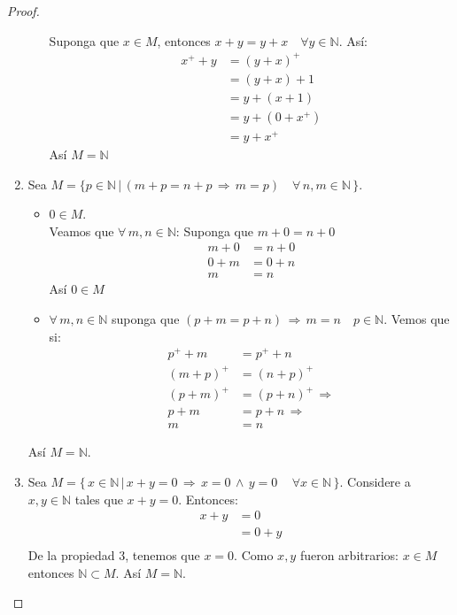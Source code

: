 \begin{proof}
\begin{enumerate}
\begin{itemize}
                Suponga que $x \in M$, entonces $x + y = y +x \quad \forall y
                \in \mathbb{N}$. Así:
                \begin{align*}
                    x^+ + y &= (y + x)^+ \\
                            &= (y + x)+1 \\
                            &= y + (x + 1) \\
                            &= y + (0 + x^+) \\
                            &= y + x^+
                \end{align*}
                Así $M = \mathbb{N}$
        \end{itemize}
    \item Sea $M = \{ p \in \mathbb{N} \, | \, (m + p = n + p \, \Rightarrow \, m
        = p) \quad \forall \, n, m \in \mathbb{N} \, \}$. 
        \begin{itemize}
            \item $0 \in M$. \\
                Veamos que $\forall \, m, n \in \mathbb{N}$:
                Suponga que $ m + 0 = n + 0 $
                \begin{align*}
                    m + 0 &= n + 0 \\
                    0 + m &= 0 + n \\
                        m &= n 
                \end{align*}
                Así $0 \in M$ 
            \item $\forall \, m, n \in \mathbb{N}$ suponga que $(p +m = p + n) \,
                \Rightarrow \,m = n 
                \quad p \in \mathbb{N}$. Vemos que si:
                \begin{align*}
                    p^+ + m &= p^+ + n \\
                    (m + p)^+ &= (n + p)^+ \\
                    (p + m)^+ &= (p + n)^+ \, \Rightarrow \\
                    p + m &= p + n \, \Rightarrow \\
                        m &= n 
                \end{align*}
        \end{itemize}
        Así $M = \mathbb{N}$.
    \item Sea $M= \{\, x \in \mathbb{N} \, | \, x + y = 0 \, \Rightarrow \, x =
    0 \, \land \, y = 0 \, \quad \forall x \in \mathbb{N} \,\}$. Considere a $x,
    y \in \mathbb{N}$ tales que $x + y = 0$. Entonces:
        \begin{align*}
            x + y &= 0 \\
                  &= 0 + y \\
        \end{align*}
        De la propiedad 3, tenemos que $x = 0$. Como $x, y$ fueron arbitrarios: 
        $x \in M$ entonces $\mathbb{N} \subset M$. 
        Así $M = \mathbb{N}$. 
    \end{enumerate}
    \end{proof}
